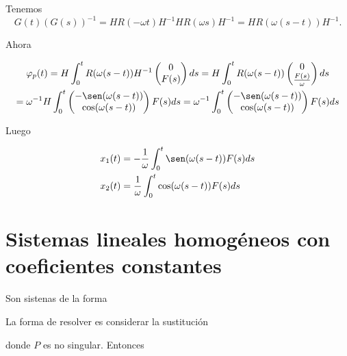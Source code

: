\begin{ejemplo}{}
Tenemos
\[
G(t)(G(s))^{-1}=H R(-\omega t) H^{-1} H R(\omega s) H^{-1} 
=H R(\omega(s-t)) H^{-1}.
\]

Ahora


\begin{multline*}
\varphi_{p}(t)=H \int_{0}^{t} R(\omega(s-t)) H^{-1}
                \begin{pmatrix}
                    0 \\
                    F(s)\\
                \end{pmatrix} ds
    =H \int_{0}^{t} R(\omega(s-t))
    \begin{pmatrix}
        0 \\
        \frac{F(s)}{\omega}\\
    \end{pmatrix}d s\\
    =\omega^{-1}H \int_{0}^{t}
    \begin{pmatrix}
        -\sen(\omega(s-t))  \\
        \cos (\omega(s-t))  
    \end{pmatrix}F(s)
    ds
    =\omega^{-1} \int_{0}^{t}
    \begin{pmatrix}
        -\sen(\omega(s-t))  \\
        \cos (\omega(s-t))  \\
    \end{pmatrix}F(s)ds
\end{multline*}

Luego

\[
\begin{split}
x_{1}(t)&=-\frac{1}{\omega} \int_{0}^{t} \sen(\omega(s-t)) F(s) d s \\
x_{2}(t)&=\frac{1}{\omega} \int_{0}^{t} \cos (\omega(s-t)) F(s) d s\\
\end{split}
\]
\end{ejemplo}


\section{Sistemas lineales homogéneos con coeficientes constantes}

Son sistenas de la forma

La forma de resolver es considerar la sustitución

donde $P$ es no singular.  Entonces

